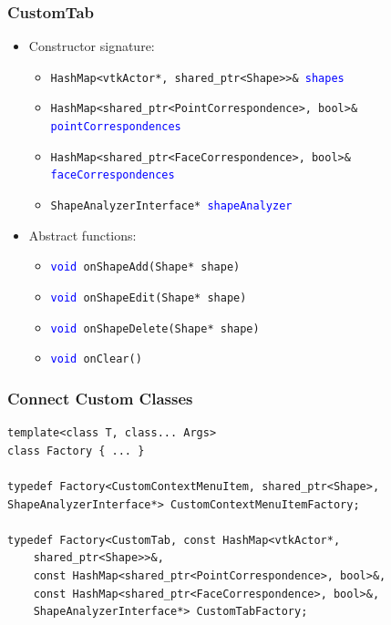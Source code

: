 \documentclass[compress]{beamer}
\begin{document}
\begin{frame}
	\frametitle{CustomTab}
	
	\begin{itemize}
		\item Constructor signature:
		\begin{itemize}
			\item \texttt{HashMap<vtkActor*, shared\_ptr<Shape>>\& \textcolor{blue}{shapes}}
			\item \texttt{HashMap<shared\_ptr<PointCorrespondence>, bool>\& \textcolor{blue}{pointCorrespondences}}
			\item \texttt{HashMap<shared\_ptr<FaceCorrespondence>, bool>\& \textcolor{blue}{faceCorrespondences}}
			\item \texttt{ShapeAnalyzerInterface* \textcolor{blue}{shapeAnalyzer}}
		\end{itemize}
		\item Abstract functions:
		\begin{itemize}
			\item \texttt{\textcolor{blue}{void} onShapeAdd(Shape* shape)}
			\item \texttt{\textcolor{blue}{void} onShapeEdit(Shape* shape)}
			\item \texttt{\textcolor{blue}{void} onShapeDelete(Shape* shape)}
			\item \texttt{\textcolor{blue}{void} onClear()}
		\end{itemize}
	\end{itemize}
\end{frame}

\begin{frame}[fragile]
\frametitle{Connect Custom Classes}

\begin{lstlisting}
template<class T, class... Args>
class Factory { ... }

typedef Factory<CustomContextMenuItem, shared_ptr<Shape>, ShapeAnalyzerInterface*> CustomContextMenuItemFactory;

typedef Factory<CustomTab, const HashMap<vtkActor*, 
    shared_ptr<Shape>>&, 
    const HashMap<shared_ptr<PointCorrespondence>, bool>&, 
    const HashMap<shared_ptr<FaceCorrespondence>, bool>&, 
    ShapeAnalyzerInterface*> CustomTabFactory;
\end{lstlisting}

\end{frame}
\end{document}

